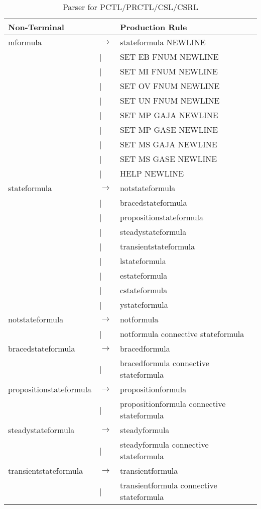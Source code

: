 \begin{table}[!ht]
\caption{Parser for PCTL/PRCTL/CSL/CSRL}
\begin{center}
\begin{tiny}
\begin{tabular}{||lll||}
\hline\hline
Non-Terminal	&  & Production Rule\\
\hline mformula & $\longrightarrow$ & stateformula NEWLINE \\
& | & SET EB FNUM NEWLINE\\
& | & SET MI FNUM NEWLINE \\
& | & SET OV FNUM NEWLINE \\
& | & SET UN FNUM NEWLINE \\
& | & SET MP GAJA NEWLINE \\
& | & SET MP GASE NEWLINE \\
& | & SET MS GAJA NEWLINE \\
& | & SET MS GASE NEWLINE \\
& | & HELP NEWLINE \\
\hline stateformula & $\longrightarrow$ & notstateformula \\
& | & bracedstateformula \\
& | & propositionstateformula \\
& | & steadystateformula \\
& | & transientstateformula \\
& | & lstateformula \\
& | & estateformula \\
& | & cstateformula \\
& | & ystateformula \\
\hline notstateformula & $\longrightarrow$ & notformula \\
& | & notformula connective stateformula \\
\hline bracedstateformula & $\longrightarrow$ & bracedformula \\
& | & bracedformula connective stateformula \\
\hline propositionstateformula & $\longrightarrow$ & propositionformula \\
& | & propositionformula connective stateformula \\
\hline steadystateformula & $\longrightarrow$ & steadyformula \\
& | & steadyformula connective stateformula \\
\hline transientstateformula & $\longrightarrow$ & transientformula \\
& | & transientformula connective stateformula \\

\end{tabular}
\end{tiny}
\end{center}
\end{table}
